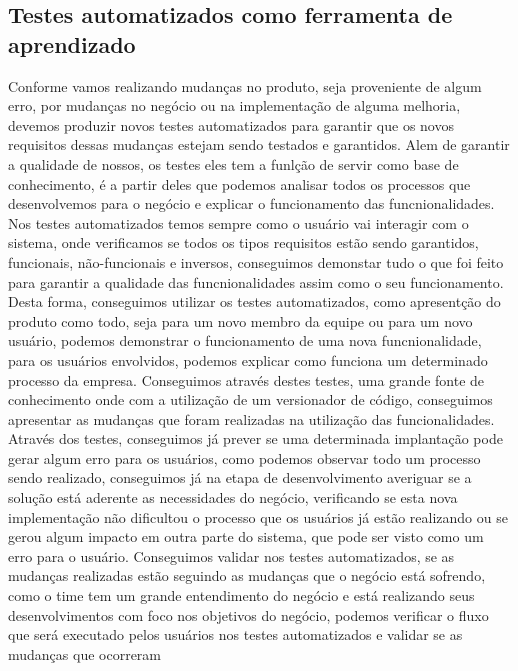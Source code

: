     \subsection{Testes automatizados como ferramenta de aprendizado}
    Conforme vamos realizando mudanças no produto, seja proveniente de algum erro,
    por mudanças no negócio ou na implementação de alguma melhoria, devemos produzir
    novos testes automatizados para garantir que os novos requisitos dessas mudanças
    estejam sendo testados e garantidos. \newline
    Alem de garantir a qualidade de nossos, os testes eles tem a funlção de servir
    como base de conhecimento, é a partir deles que podemos analisar todos os
    processos que desenvolvemos para o negócio e explicar o funcionamento das
    funcnionalidades. Nos testes automatizados temos sempre como o usuário vai
    interagir com o sistema, onde verificamos se todos os tipos requisitos estão
    sendo garantidos, funcionais, não-funcionais e inversos, conseguimos demonstar
    tudo o que foi feito para garantir a qualidade das funcnionalidades assim
    como o seu funcionamento. Desta forma, conseguimos utilizar os testes automatizados,
    como apresentção do produto como todo, seja para um novo membro da equipe ou
    para um novo usuário, podemos demonstrar o funcionamento de uma nova funcnionalidade,
    para os usuários envolvidos, podemos explicar como funciona um determinado
    processo da empresa. Conseguimos através destes testes, uma grande fonte de
    conhecimento onde com a utilização de um versionador de código, conseguimos
    apresentar as mudanças que foram realizadas na utilização das funcionalidades.
    Através dos testes, conseguimos já prever se uma determinada implantação pode
    gerar algum erro para os usuários, como podemos observar todo um processo sendo
    realizado, conseguimos já na etapa de desenvolvimento averiguar se a solução
    está aderente as necessidades do negócio, verificando se esta nova implementação
    não dificultou o processo que os usuários já estão realizando ou se gerou algum
    impacto em outra parte do sistema, que pode ser visto como um erro para o
    usuário. Conseguimos validar nos testes automatizados, se as mudanças realizadas
    estão seguindo as mudanças que o negócio está sofrendo, como o time tem um
    grande entendimento do negócio e está realizando seus desenvolvimentos com
    foco nos objetivos do negócio, podemos verificar o fluxo que será executado
    pelos usuários nos testes automatizados e validar se as mudanças que ocorreram
